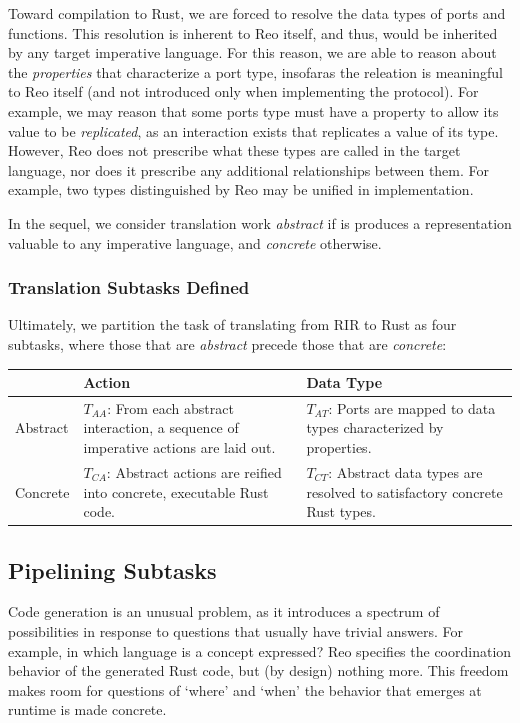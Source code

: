 Toward compilation to Rust, we are forced to resolve the data types of ports and functions. This resolution is inherent to Reo itself, and thus, would be inherited by any target imperative language. For this reason, we are able to reason about the \textit{properties} that characterize a port type, insofaras the releation is meaningful to Reo itself (and not introduced only when implementing the protocol). For example, we may reason that some ports type must have a property to allow its value to be \textit{replicated}, as an interaction exists that replicates a value of its type. However, Reo does not prescribe what these types are called in the target language, nor does it prescribe any additional relationships between them. For example, two types distinguished by Reo may be unified in implementation. 

In the sequel, we consider translation work \textit{abstract} if is produces a representation valuable to any imperative language, and \textit{concrete} otherwise.


\subsubsection{Translation Subtasks Defined}

Ultimately, we partition the task of translating from RIR to Rust as four subtasks, where those that are \textit{abstract} precede those that are \textit{concrete}:

\begin{tabular}{l|p{5cm}p{5cm}}
	& Action & Data Type \\
	\hline
	Abstract & $T_{AA}$: From each abstract interaction, a sequence of imperative actions are laid out. & $T_{AT}$: Ports are mapped to data types characterized by properties. \\
	\hline
	Concrete & $T_{CA}$: Abstract actions are reified into concrete, executable Rust code. & $T_{CT}$: Abstract data types are resolved to satisfactory concrete Rust types.
\end{tabular}


\subsection{Pipelining Subtasks}
\label{sec:decoupling_reo_rust}

Code generation is an unusual problem, as it introduces a spectrum of possibilities in response to questions that usually have trivial answers. For example, in which language is a concept expressed? Reo specifies the coordination behavior of the generated Rust code, but (by design) nothing more. This freedom makes room for questions of `where' and `when' the behavior that emerges at runtime is made concrete. 

